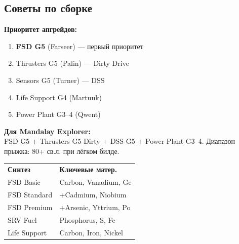 \edsep

\subsection{Советы по сборке}

\begin{tcolorbox}[edbox]
{\color{edorange}\fontsize{7}{8.5}\selectfont\bfseries Приоритет апгрейдов:}\\[1mm]
\begin{enumerate}
\item {\fontsize{7}{8.5}\selectfont\textbf{FSD G5} (Farseer) — первый приоритет}
\item {\fontsize{7}{8.5}\selectfont Thrusters G5 (Palin) — Dirty Drive}
\item {\fontsize{7}{8.5}\selectfont Sensors G5 (Turner) — DSS}
\item {\fontsize{7}{8.5}\selectfont Life Support G4 (Martuuk)}
\item {\fontsize{7}{8.5}\selectfont Power Plant G3--4 (Qwent)}
\end{enumerate}
\end{tcolorbox}

\vspace{1.5mm}

\begin{tcolorbox}[edbox]
{\color{edorange}\fontsize{7}{8.5}\selectfont\bfseries Для Mandalay Explorer:}\\[0.5mm]
{\color{edgraytext}\fontsize{6.5}{7.5}\selectfont
  FSD G5 + Thrusters G5 Dirty + DSS G5 + Power Plant G3--4.
  Диапазон прыжка: 80+ св.л. при лёгком билде.}
\end{tcolorbox}

\vspace{1.5mm}

\begin{tabular}{p{28mm}p{32mm}}
\rowcolor{edheaderbg}
{\color{edorange}\fontsize{6.5}{8}\selectfont\bfseries Синтез} &
{\color{edorange}\fontsize{6.5}{8}\selectfont\bfseries Ключевые матер.}\\
\rowcolor{edtablebg}
{\fontsize{6.5}{8}\selectfont FSD Basic} &
{\color{edgraytext}\fontsize{6.5}{8}\selectfont Carbon, Vanadium, Ge}\\
\rowcolor{edtablealt}
{\fontsize{6.5}{8}\selectfont FSD Standard} &
{\color{edgraytext}\fontsize{6.5}{8}\selectfont +Cadmium, Niobium}\\
\rowcolor{edtablebg}
{\fontsize{6.5}{8}\selectfont FSD Premium} &
{\color{edgraytext}\fontsize{6.5}{8}\selectfont +Arsenic, Yttrium, Po}\\
\rowcolor{edtablealt}
{\fontsize{6.5}{8}\selectfont SRV Fuel} &
{\color{edgraytext}\fontsize{6.5}{8}\selectfont Phosphorus, S, Fe}\\
\rowcolor{edtablebg}
{\fontsize{6.5}{8}\selectfont Life Support} &
{\color{edgraytext}\fontsize{6.5}{8}\selectfont Carbon, Iron, Nickel}\\
\end{tabular}
